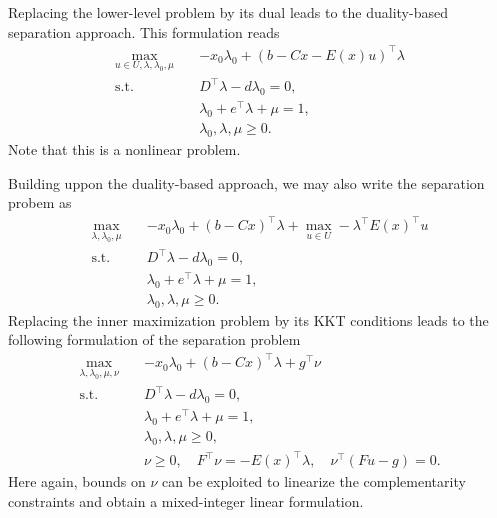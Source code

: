 Replacing the lower-level problem by its dual leads to the duality-based
separation approach. This formulation reads 
\begin{align*}
    \max_{u\in U,\lambda,\lambda_0,\mu} \quad & -x_0\lambda_0 + (b - Cx - E(x)u)^\top \lambda \\
    \text{s.t.} \quad & D^\top\lambda - d\lambda_0 = 0, \\
    & \lambda_0 + e^\top\lambda + \mu = 1, \\
    & \lambda_0, \lambda, \mu \ge 0.
\end{align*}
Note that this is a nonlinear problem. 


Building uppon the duality-based approach, we may also write the separation
probem as 
\begin{align*}
    \max_{\lambda,\lambda_0,\mu} \quad & -x_0\lambda_0 + (b - Cx)^\top \lambda + \max_{u\in U}- \lambda^\top E(x)^\top u \\
    \text{s.t.} \quad & D^\top\lambda - d\lambda_0 = 0, \\
    & \lambda_0 + e^\top\lambda + \mu = 1, \\
    & \lambda_0, \lambda, \mu \ge 0.
\end{align*}
Replacing the inner maximization problem by its KKT conditions leads to the
following formulation of the separation problem
\begin{align*}
    \max_{\lambda,\lambda_0,\mu,\nu} \quad & -x_0\lambda_0 + (b - Cx)^\top \lambda + g^\top\nu \\
    \text{s.t.} \quad & D^\top\lambda - d\lambda_0 = 0, \\
    & \lambda_0 + e^\top\lambda + \mu = 1, \\
    & \lambda_0, \lambda, \mu \ge 0, \\
    & \nu\ge 0, \quad F^\top\nu = -E(x)^\top\lambda, \quad \nu^\top(Fu - g) = 0.
\end{align*}
Here again, bounds on $\nu$ can be exploited to linearize the complementarity
constraints and obtain a mixed-integer linear formulation.


